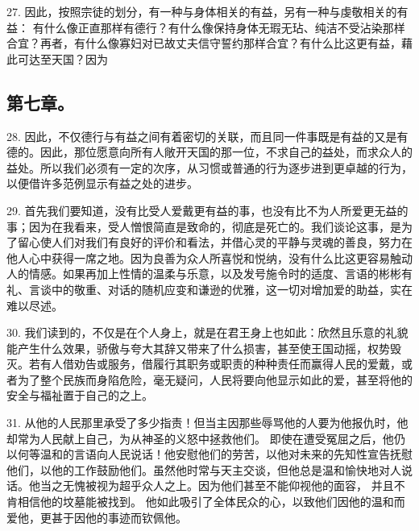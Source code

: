 27. 因此，按照宗徒的划分，有一种与身体相关的有益，另有一种与虔敬相关的有益： 有什么像正直那样有德行？有什么像保持身体无瑕无玷、纯洁不受沾染那样合宜？再者，有什么像寡妇对已故丈夫信守誓约那样合宜？有什么比这更有益，藉此可达至天国？因为\par


\subsection{第七章。}

\par

28. 因此，不仅德行与有益之间有着密切的关联，而且同一件事既是有益的又是有德的。因此，那位愿意向所有人敞开天国的那一位，不求自己的益处，而求众人的益处。所以我们必须有一定的次序，从习惯或普通的行为逐步进到更卓越的行为，以便借许多范例显示有益之处的进步。\par

29. 首先我们要知道，没有比受人爱戴更有益的事，也没有比不为人所爱更无益的事；因为在我看来，受人憎恨简直是致命的，彻底是死亡的。我们谈论这事，是为了留心使人们对我们有良好的评价和看法，并借心灵的平静与灵魂的善良，努力在他人心中获得一席之地。因为良善为众人所喜悦和悦纳，没有什么比这更容易触动人的情感。如果再加上性情的温柔与乐意，以及发号施令时的适度、言语的彬彬有礼、言谈中的敬重、对话的随机应变和谦逊的优雅，这一切对增加爱的助益，实在难以尽述。\par

30. 我们读到的，不仅是在个人身上，就是在君王身上也如此：欣然且乐意的礼貌能产生什么效果，骄傲与夸大其辞又带来了什么损害，甚至使王国动摇，权势毁灭。若有人借劝告或服务，借履行其职务或职责的种种责任而赢得人民的爱戴，或者为了整个民族而身陷危险，毫无疑问，人民将要向他显示如此的爱，甚至将他的安全与福祉置于自己的之上。\par

31. 从他的人民那里承受了多少指责！但当主因那些辱骂他的人要为他报仇时，他却常为人民献上自己，为从神圣的义怒中拯救他们。 即使在遭受冤屈之后，他仍以何等温和的言语向人民说话！他安慰他们的劳苦，以他对未来的先知性宣告抚慰他们，以他的工作鼓励他们。虽然他时常与天主交谈，但他总是温和愉快地对人说话。他当之无愧被视为超乎众人之上。因为他们甚至不能仰视他的面容， 并且不肯相信他的坟墓能被找到。 他如此吸引了全体民众的心，以致他们因他的温和而爱他，更甚于因他的事迹而钦佩他。\par

